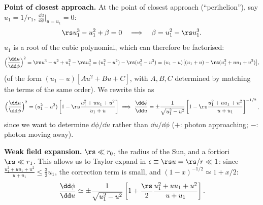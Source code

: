 \textbf{Point of closest approach.} At the point of closest approach (``perihelion''), say $u_1=1/r_1$, $\frac{\dd u}{\dd\phi}\big|_{u=u_1}=0$:
\[
  \rs u_1^3-u_1^2+\beta=0\quad\Longrightarrow\quad\beta=u_1^2-\rs u_1^3 .
\]
$u_1$ is a root of the cubic polynomial, which can therefore be factorised:
\begin{equation}
  \Big(\frac{\dd u}{\dd\phi}\Big)^2=\rs u^3-u^2+u_1^2-\rs u_1^3=(u_1^2-u^2)-\rs(u_1^3-u^3)=(u_1-u)\big[(u_1+u)-\rs(u_1^2+uu_1+u^2)\big],
\end{equation}
(of the form $(u_1-u)[Au^2+Bu+C]$, with $A,B,C$ determined by matching the terms of the same order). We rewrite this as
\[
  \Big(\frac{\dd u}{\dd\phi}\Big)^2=(u_1^2-u^2)\left[1-\rs\frac{u_1^2+uu_1+u^2}{u_1+u}\right]
  \ \Longrightarrow\
  \frac{\dd\phi}{\dd u}=\pm\frac{1}{\sqrt{u_1^2-u^2}}\left[1-\rs\frac{u_1^2+uu_1+u^2}{u+u_1}\right]^{-1/2},
\]
since we want to determine $\dd\phi/\dd u$ rather than $\dd u/\dd\phi$ ($+$: photon approaching; $-$: photon moving away).

\textbf{Weak field expansion.} $\rs\ll r_0$, the radius of the Sun, and a fortiori $\rs\ll r_1$. This allows us to Taylor expand in $\epsilon\equiv\rs u=\rs/r\ll1$: since $\frac{u_1^2+uu_1+u^2}{u+u_1}\le\frac32u_1$, the correction term is small, and $(1-x)^{-1/2}\simeq1+x/2$:
\begin{equation}
  \frac{\dd\phi}{\dd u}\simeq\pm\frac{1}{\sqrt{u_1^2-u^2}}\left[1+\frac\rs2\frac{u_1^2+uu_1+u^2}{u+u_1}\right].
\end{equation}

